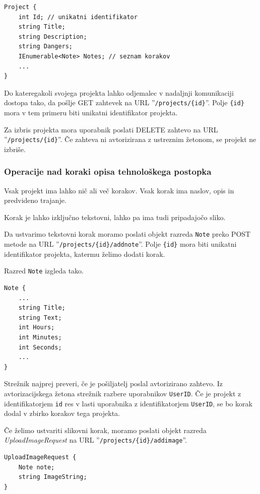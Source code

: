 \documentclass[a4paper, 12pt]{book}
\begin{document}
\begin{verbatim}
Project { 
    int Id; // unikatni identifikator 
    string Title; 
    string Description; 
    string Dangers; 
    IEnumerable<Note> Notes; // seznam korakov 
    ... 
}
\end{verbatim}
Do kateregakoli svojega projekta lahko odjemalec v nadaljnji komunikaciji dostopa tako, da pošlje GET zahtevek na URL ''\texttt{/projects/\{id\}}''.
Polje \texttt{\{id\}} mora v tem primeru biti unikatni identifikator projekta.

Za izbris projekta mora uporabnik poslati DELETE zahtevo na URL ''\texttt{/projects/\{id\}}''.
Če zahteva ni avtorizirana z ustreznim žetonom, se projekt ne izbriše.

\subsubsection{Operacije nad koraki opisa tehnološkega postopka}

Vsak projekt ima lahko nič ali več korakov.
Vsak korak ima naslov, opis in predvideno trajanje.

Korak je lahko izključno tekstovni, lahko pa ima tudi pripadajočo sliko.

Da ustvarimo tekstovni korak moramo poslati objekt razreda \texttt{Note} preko POST metode na URL ''\texttt{/projects/\{id\}/addnote}''.
Polje \texttt{\{id\}} mora biti unikatni identifikator projekta, katermu želimo dodati korak.

\noindent Razred \texttt{Note} izgleda tako.

\begin{verbatim}
Note { 
    ... 
    string Title; 
    string Text; 
    int Hours; 
    int Minutes;
    int Seconds;
    ...
}
\end{verbatim}

Strežnik najprej preveri, če je pošiljatelj poslal avtorizirano zahtevo.
Iz avtorizacijskega žetona strežnik razbere uporabnikov \texttt{UserID}. 
Če je projekt z identifikatorjem \texttt{id} res v lasti uporabnika z identifikatorjem \texttt{UserID}, se bo korak dodal v zbirko korakov tega projekta.

Če želimo ustvariti slikovni korak, moramo poslati objekt razreda \textit{UploadImageRequest} na URL ''\texttt{/projects/\{id\}/addimage}''.

\begin{verbatim}
UploadImageRequest { 
    Note note; 
    string ImageString; 
}
\end{verbatim}
\end{document}
